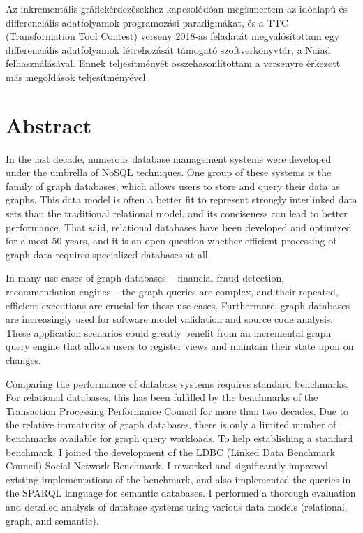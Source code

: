 Az inkrementális gráflekérdezésekhez kapcsolódóan megismertem az időalapú és differenciális adatfolyamok programozási paradigmákat, és a TTC (Transformation Tool Contest) verseny 2018-as feladatát megvalósítottam egy differenciális adatfolyamok létrehozását támogató szoftverkönyvtár, a Naiad felhasználásával. Ennek teljesítményét összehasonlítottam a versenyre érkezett más megoldások teljesítményével.

\vfill
\selectenglish


\chapter*{Abstract}

In the last decade, numerous database management systems were developed under the umbrella of  NoSQL techniques. One group of these systems is the family of graph databases, which allows users to store and query their data as graphs. This data model is often a better fit to represent strongly interlinked data sets than the traditional relational model, and its conciseness can lead to better performance. That said, relational databases have been developed and optimized for almost 50 years, and it is an open question whether efficient processing of graph data requires specialized databases at all.

In many use cases of graph databases -- financial fraud detection, recommendation engines -- the graph queries are complex, and their repeated, efficient executions are crucial for these use cases. Furthermore, graph databases are increasingly used for software model validation and source code analysis. These application scenarios could greatly benefit from an incremental graph query engine that allows users to register views and maintain their state upon on changes.

Comparing the performance of database systems requires standard benchmarks. For relational databases, this has been fulfilled by the benchmarks of the Transaction Processing Performance Council for more than two decades. Due to the relative immaturity of graph databases, there is only a limited number of benchmarks available for graph query workloads. To help establishing a standard benchmark, I joined the development of the LDBC (Linked Data Benchmark Council) Social Network Benchmark. I reworked and significantly improved existing implementations of the benchmark, and also implemented the queries in the SPARQL language for semantic databases. I performed a thorough evaluation and detailed analysis of database systems using various data models (relational, graph, and semantic).

